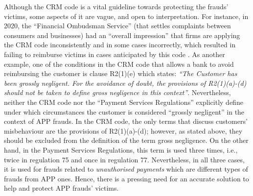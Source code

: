 


Although the CRM code is a vital guideline towards protecting the frauds' victims, some aspects of it are vague, and open to interpretation. For instance, in 2020, the ``Financial Ombudsman Service'' (that settles complaints between consumers and businesses)  had an ``overall impression'' that firms are applying the CRM code inconsistently and in some cases incorrectly, which resulted in failing to reimburse victims in cases anticipated by this code \cite{Financial-Ombudsman-Service-response}.
%
 As another example, one of the conditions in the CRM code that allows a bank to avoid reimbursing the customer is clause R2(1)(e) which states: \textit{``The Customer has been grossly negligent. For the avoidance of doubt, the provisions of R2(1)(a)-(d) should not be taken to define gross negligence in this context''}.  Nevertheless, neither the CRM code nor the ``Payment Services Regulations'' \cite{Regulations}   explicitly define under which circumstances the customer is considered ``grossly negligent'' in the context of  APP frauds. In the CRM code, the only terms that discuss customers' misbehaviour are the provisions of R2(1)(a)-(d); however, as stated above, they should be excluded from the definition of the term gross negligence. On the other hand,  in the Payment Services Regulations, this term is used three times, i.e.,  twice in regulation 75 and once in regulation 77. Nevertheless, in all three cases, it is used for frauds related to \emph{unauthorised payments} which are different types of frauds from  APP ones. Hence, there is a pressing need for an accurate solution to help and protect  APP frauds' victims. 


